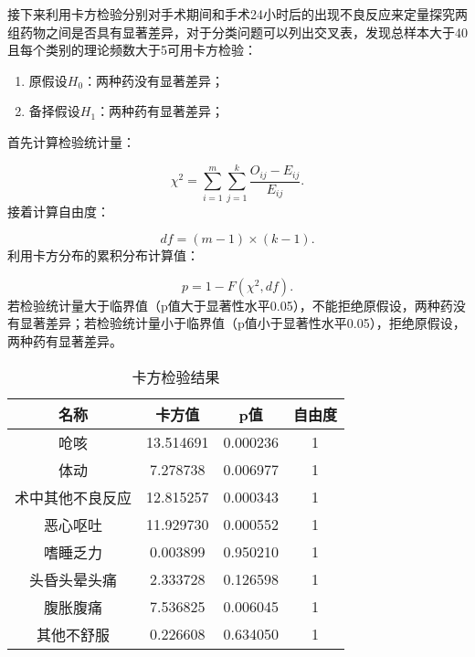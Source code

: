 接下来利用卡方检验分别对手术期间和手术24小时后的出现不良反应来定量探究两组药物之间是否具有显著差异，对于分类问题可以列出交叉表，发现总样本大于40且每个类别的理论频数大于5可用卡方检验：

\begin{enumerate}
    \item 原假设${{H}_{0}}$：两种药没有显著差异；
    \item 备择假设${{H}_{1}}$：两种药有显著差异；
\end{enumerate}

首先计算检验统计量：

\begin{equation}
    {{\chi }^{2}}=\sum\limits_{i=1}^{m}{\sum\limits_{j=1}^{k}{\frac{{{O}_{ij}}-{{E}_{ij}}}{{{E}_{ij}}}}}.
\end{equation}
接着计算自由度：

\begin{equation}
    df=\left( m-1 \right)\times \left( k-1 \right).
\end{equation}
利用卡方分布的累积分布计算值：

\begin{equation}
    p=1-F\left( {{\chi }^{2}},df \right).
\end{equation}
若检验统计量大于临界值（p值大于显著性水平0.05），不能拒绝原假设，两种药没有显著差异；若检验统计量小于临界值（p值小于显著性水平0.05），拒绝原假设，两种药有显著差异。

\begin{table}[H]
	\centering  %
    \caption{卡方检验结果}
	\begin{tabular}{c c c c}  %
		\toprule[1.5pt]  %
		名称 & 卡方值 & p值 & 自由度  \\   %
		\midrule[1pt]    %
        呛咳 & 	13.514691 & 0.000236 &	1  \\
        体动 & 	7.278738 & 	0.006977	 & 1  \\
        术中其他不良反应 & 	12.815257 &	0.000343 &	1  \\
        恶心呕吐 & 	11.929730 &	0.000552 &	1  \\
        嗜睡乏力 & 	0.003899 &	0.950210 &	1  \\
        头昏头晕头痛 & 	2.333728 &	0.126598 &	1  \\
        腹胀腹痛 & 	7.536825 &	0.006045 &	1  \\
        其他不舒服 & 	0.226608	 & 0.634050 &	1  \\
		\toprule[1.5pt]  %
	\end{tabular}  
\end{table} 


